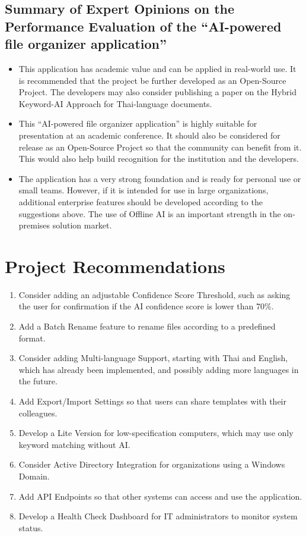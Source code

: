 \documentclass[12pt,oneside,openright,a4paper]{cpe-english-project}
\begin{document}
\subsection*{Summary of Expert Opinions on the Performance Evaluation of the ``AI-powered file organizer application''}
\begin{itemize}
\item This application has academic value and can be applied in real-world use. It is recommended that the project be further developed as an Open-Source Project. The developers may also consider publishing a paper on the Hybrid Keyword-AI Approach for Thai-language documents.
\item This ``AI-powered file organizer application'' is highly suitable for presentation at an academic conference. It should also be considered for release as an Open-Source Project so that the community can benefit from it. This would also help build recognition for the institution and the developers.
\item The application has a very strong foundation and is ready for personal use or small teams. However, if it is intended for use in large organizations, additional enterprise features should be developed according to the suggestions above. The use of Offline AI is an important strength in the on-premises solution market.
\end{itemize}
\section{Project Recommendations}
\begin{enumerate}[label=\arabic*.,leftmargin=0.6in]
\item Consider adding an adjustable Confidence Score Threshold, such as asking the user for confirmation if the AI confidence score is lower than 70\%.
\item Add a Batch Rename feature to rename files according to a predefined format.
\item Consider adding Multi-language Support, starting with Thai and English, which has already been implemented, and possibly adding more languages in the future.
\item Add Export/Import Settings so that users can share templates with their colleagues.
\item Develop a Lite Version for low-specification computers, which may use only keyword matching without AI.
\item Consider Active Directory Integration for organizations using a Windows Domain.
\item Add API Endpoints so that other systems can access and use the application.
\item Develop a Health Check Dashboard for IT administrators to monitor system status.
\end{enumerate}
\end{document}
